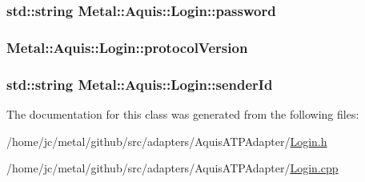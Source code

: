 \subsubsection[{password}]{\setlength{\rightskip}{0pt plus 5cm}std\+::string Metal\+::\+Aquis\+::\+Login\+::password}\label{classMetal_1_1Aquis_1_1Login_a3be13314d3efe4ab2f2c3ac1b5ef7837}
\hypertarget{classMetal_1_1Aquis_1_1Login_aac6c4b119ac0a8cb000ceb3a61dbae2c}{}
\subsubsection[{protocol\+Version}]{ Metal\+::\+Aquis\+::\+Login\+::protocol\+Version}\label{classMetal_1_1Aquis_1_1Login_aac6c4b119ac0a8cb000ceb3a61dbae2c}
\hypertarget{classMetal_1_1Aquis_1_1Login_a4c8fd09c03114efa108b279f97e6337f}{}
\subsubsection[{sender\+Id}]{\setlength{\rightskip}{0pt plus 5cm}std\+::string Metal\+::\+Aquis\+::\+Login\+::sender\+Id}\label{classMetal_1_1Aquis_1_1Login_a4c8fd09c03114efa108b279f97e6337f}


The documentation for this class was generated from the following files\+:\begin{DoxyCompactItemize}
\item 
/home/jc/metal/github/src/adapters/\+Aquis\+A\+T\+P\+Adapter/\hyperlink{Login_8h}{Login.\+h}\item 
/home/jc/metal/github/src/adapters/\+Aquis\+A\+T\+P\+Adapter/\hyperlink{Login_8cpp}{Login.\+cpp}\end{DoxyCompactItemize}
